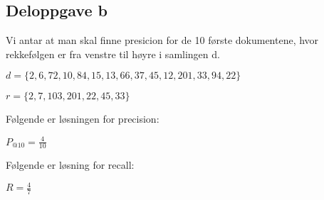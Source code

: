 \subsection*{Deloppgave b}

\vspace{3 mm}

Vi antar at man skal finne presicion for de 10 første dokumentene, hvor rekkefølgen er fra venstre til høyre i samlingen d.

\vspace{3 mm}

$d = \{2,6,72,10,84,15,13,66,37,45,12,201,33,94,22\}$

\vspace{3 mm}

$r = \{2,7,103,201,22,45,33\}$
\vspace{6 mm}

\noindent Følgende er løsningen for precision:

\vspace{3 mm}

\begin{center}
$P_{@10} = \frac{4}{10}$
\end{center}

\vspace{3 mm}

\noindent Følgende er løsning for recall:

\vspace{3 mm}

\begin{center}
$R = \frac{4}{7}$
\end{center}
